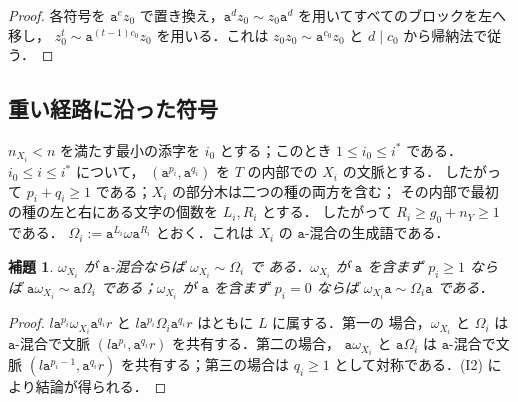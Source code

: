\documentclass[11pt,a4paper]{ltjsarticle}
\numberwithin{equation}{section}
\theoremstyle{plain}
\newtheorem{lemma}[theorem]{補題}
\theoremstyle{definition}
\theoremstyle{remark}
\theoremstyle{plain}
\begin{document}
\begin{proof}
各符号を $\mathtt a^ez_0$ で置き換え，$\mathtt a^dz_0\sim z_0\mathtt a^d$
を用いてすべてのブロックを左へ移し，
$z_0^t\sim\mathtt a^{(t-1)c_0}z_0$ を用いる．これは
$z_0z_0\sim\mathtt a^{c_0}z_0$ と $d\mid c_0$ から帰納法で従う．
\end{proof}

\subsection{重い経路に沿った符号}

$n_{X_i}<n$ を満たす最小の添字を $i_0$ とする；このとき
$1\le i_0\le i^*$ である．$i_0\le i\le i^*$ について，
$(\mathtt a^{p_i},\mathtt a^{q_i})$ を $T$ の内部での $X_i$ の文脈とする．
したがって $p_i+q_i\ge1$ である；$X_i$ の部分木は二つの種の両方を含む；
その内部で最初の種の左と右にある文字の個数を $L_i,R_i$ とする．
したがって $R_i\ge g_0+n_Y\ge1$ である．
$\Omega_i:=\mathtt a^{L_i}\omega\mathtt a^{R_i}$ とおく．これは $X_i$ の
$\mathtt a$-混合の生成語である．

\begin{lemma}
\label{lem:app-h-borrow}
$\omega_{X_i}$ が $\mathtt a$-混合ならば $\omega_{X_i}\sim\Omega_i$ で
ある．$\omega_{X_i}$ が $\mathtt a$ を含まず $p_i\ge1$ ならば
$\mathtt a\omega_{X_i}\sim\mathtt a\Omega_i$ である；$\omega_{X_i}$ が
$\mathtt a$ を含まず $p_i=0$ ならば
$\omega_{X_i}\mathtt a\sim\Omega_i\mathtt a$ である．
\end{lemma}

\begin{proof}
$l\mathtt a^{p_i}\omega_{X_i}\mathtt a^{q_i}r$ と
$l\mathtt a^{p_i}\Omega_i\mathtt a^{q_i}r$ はともに $L$ に属する．第一の
場合，$\omega_{X_i}$ と $\Omega_i$ は $\mathtt a$-混合で文脈
$(l\mathtt a^{p_i},\mathtt a^{q_i}r)$ を共有する．第二の場合，
$\mathtt a\omega_{X_i}$ と $\mathtt a\Omega_i$ は $\mathtt a$-混合で文脈
$(l\mathtt a^{p_i-1},\mathtt a^{q_i}r)$ を共有する；第三の場合は
$q_i\ge1$ として対称である．(I2) により結論が得られる．
\end{proof}
\end{document}
